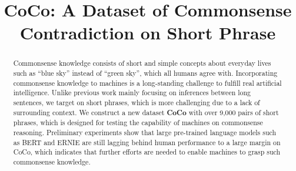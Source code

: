 \documentclass[letterpaper]{article} %
\title{CoCo: A Dataset of Commonsense Contradiction on Short Phrase}
\newcommand{\KZ}[1]{\textcolor{red}{Kenny: #1}}
\newcommand{\JQ}[1]{\textcolor{blue}{JQ: #1}}
\begin{document}
\maketitle

\begin{abstract}

Commonsense knowledge consists of short and simple concepts about everyday lives such as ``blue sky'' instead of ``green sky'', which all humans agree with.
Incorporating commonsense knowledge to machines is a long-standing challenge to fulfill real artificial intelligence.
Unlike previous work mainly focusing on inferences between long sentences, we target on short phrases, which is more challenging due to a lack of surrounding context. We construct a new dataset \textbf{CoCo} with over 9,000 pairs of short phrases, which is designed for testing the capability of machines on commonsense reasoning.
Preliminary experiments show that large pre-trained language models such as BERT and ERNIE are still lagging behind human performance to a large margin on CoCo, which indicates that further efforts are needed to enable machines to grasp such commonsense knowledge. 
\end{abstract}

\begin{CJK}{UTF8}{gbsn}







 


\end{CJK}
\end{document}
